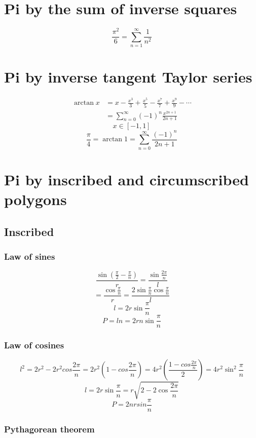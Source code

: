\documentclass{article}
\begin{document}
\section{Pi by the sum of inverse squares}

$$\frac{\pi^2}{6} = \sum_{n=1}^{\infty}\frac{1}{n^2}$$

\section{Pi by inverse tangent Taylor series}

\begin{align*}
\arctan x &= x - \frac{x^3}{3} + \frac{x^5}{5} - \frac{x^7}{7} + \frac{x^9}{9} - \cdots \\
          &= \sum_{n=0}^{\infty} (-1)^n \frac{x^{2n + 1}}{2n + 1}
\end{align*}
$$x \in [-1, 1]$$
$$\frac{\pi}{4} = \arctan 1
= \sum_{n=0}^{\infty} \frac{(-1)^n}{2n + 1}$$

\section{Pi by inscribed and circumscribed polygons}

\subsection{Inscribed}

\subsubsection{Law of sines}

$$\frac{\sin(\frac{\pi}{2}-\frac{\pi}{n})}{r} = \frac{\sin\frac{2\pi}{n}}{l}$$
$$= \frac{\cos\frac{\pi}{n}}{r} = \frac{2\sin\frac{\pi}{n}\cos\frac{\pi}{n}}{l}$$
$$l = 2r\sin\frac{\pi}{n}$$
$$P = ln
= 2rn\sin\frac{\pi}{n}$$

\subsubsection{Law of cosines}

$$l^2 = 2r^2 - 2r^2cos\frac{2\pi}{n}
= 2r^2\left(1 - cos\frac{2\pi}{n}\right)
= 4r^2\left(\frac{1 - cos\frac{2\pi}{n}}{2}\right)
= 4r^2\sin^2{\frac{\pi}{n}}$$
$$l = 2r\sin\frac{\pi}{n} = r\sqrt{2 - 2\cos\frac{2\pi}{n}}$$
$$P = 2nrsin\frac{\pi}{n}$$

\subsubsection{Pythagorean theorem}
\end{document}
